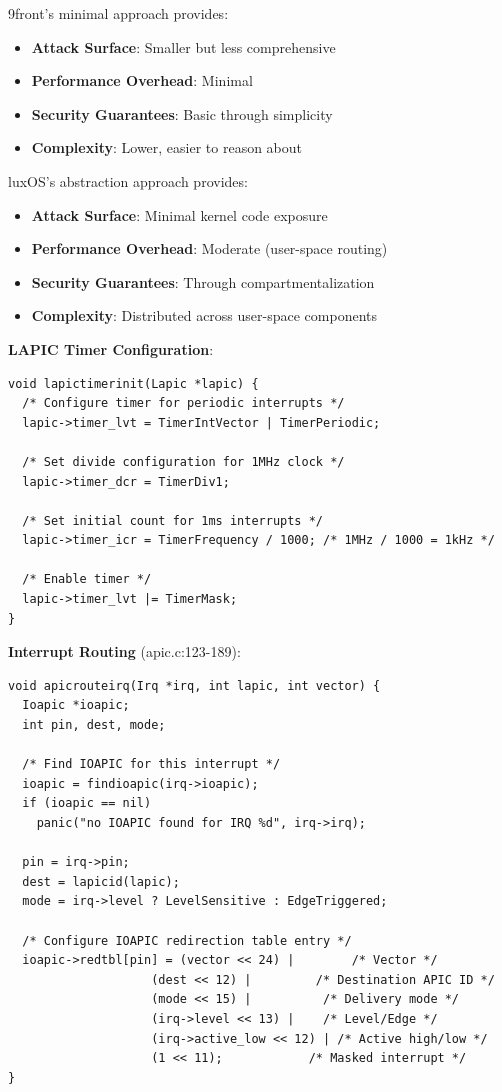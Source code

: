 \documentclass[11pt,letterpaper]{article}
\begin{document}
9front's minimal approach provides:
\begin{itemize}
\item \textbf{Attack Surface}: Smaller but less comprehensive
\item \textbf{Performance Overhead}: Minimal
\item \textbf{Security Guarantees}: Basic through simplicity
\item \textbf{Complexity}: Lower, easier to reason about
\end{itemize}

luxOS's abstraction approach provides:
\begin{itemize}
\item \textbf{Attack Surface}: Minimal kernel code exposure
\item \textbf{Performance Overhead}: Moderate (user-space routing)
\item \textbf{Security Guarantees}: Through compartmentalization
\item \textbf{Complexity}: Distributed across user-space components
\end{itemize}

\textbf{LAPIC Timer Configuration}:

\begin{lstlisting}
void lapictimerinit(Lapic *lapic) {
  /* Configure timer for periodic interrupts */
  lapic->timer_lvt = TimerIntVector | TimerPeriodic;
  
  /* Set divide configuration for 1MHz clock */
  lapic->timer_dcr = TimerDiv1;
  
  /* Set initial count for 1ms interrupts */
  lapic->timer_icr = TimerFrequency / 1000; /* 1MHz / 1000 = 1kHz */
  
  /* Enable timer */
  lapic->timer_lvt |= TimerMask;
}
\end{lstlisting}

\textbf{Interrupt Routing} (apic.c:123-189):

\begin{lstlisting}
void apicrouteirq(Irq *irq, int lapic, int vector) {
  Ioapic *ioapic;
  int pin, dest, mode;
  
  /* Find IOAPIC for this interrupt */
  ioapic = findioapic(irq->ioapic);
  if (ioapic == nil)
    panic("no IOAPIC found for IRQ %d", irq->irq);
  
  pin = irq->pin;
  dest = lapicid(lapic);
  mode = irq->level ? LevelSensitive : EdgeTriggered;
  
  /* Configure IOAPIC redirection table entry */
  ioapic->redtbl[pin] = (vector << 24) |        /* Vector */
                    (dest << 12) |         /* Destination APIC ID */
                    (mode << 15) |          /* Delivery mode */
                    (irq->level << 13) |    /* Level/Edge */
                    (irq->active_low << 12) | /* Active high/low */
                    (1 << 11);            /* Masked interrupt */
}
\end{lstlisting}
\end{document}
